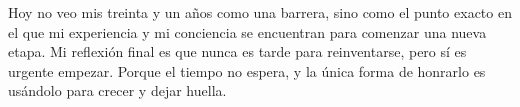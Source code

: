 Hoy no veo mis treinta y un años como una barrera, sino como el punto exacto en el que mi experiencia y mi conciencia se encuentran para comenzar una nueva etapa. Mi reflexión final es que nunca es tarde para reinventarse, pero sí es urgente empezar. Porque el tiempo no espera, y la única forma de honrarlo es usándolo para crecer y dejar huella.